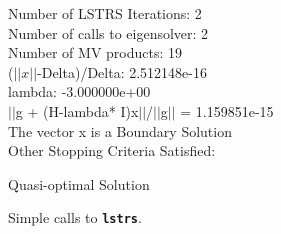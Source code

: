 \documentclass[acmtoms]{acmtrans2m}
\begin{document}
\begin{figure}[h!tbp]
\begin{center}
{{{Number of LSTRS Iterations:     2\\
Number of calls to eigensolver: 2\\
Number of MV products:          19\\

($||x||$-Delta)/Delta: 2.512148e-16\\

lambda: -3.000000e+00\\

$||$g + (H-lambda* I)x$||$/$||$g$||$ = 1.159851e-15\\

The vector x is a Boundary Solution\\

Other Stopping Criteria Satisfied:

\hspace{0.5cm} Quasi-optimal Solution
}
}}
\caption{Simple calls to {\tt\bf lstrs}.}\label{simple}
\end{center}
\end{figure}
\end{document}
